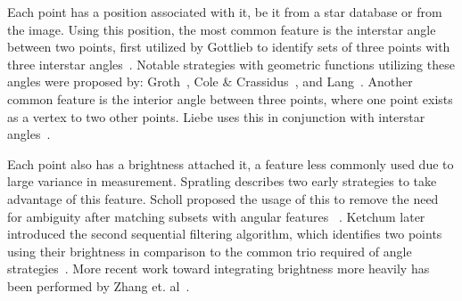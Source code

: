 Each point has a position associated with it, be it from a star database or from the image.
Using this position, the most common feature is the interstar angle between two points, first utilized by
Gottlieb to identify sets of three points with three interstar angles~\cite{gottlieb:spacecraftAttitudeDetermination}.
Notable strategies with geometric functions utilizing these angles were proposed by:
Groth~\cite{groth:patternMatchingMethod}, Cole \&
Crassidus~\cite{coleAndCrassidis:sphericalTriangleMethod,coleAndCrassidis:planarTriangleMethod}, and
Lang~\cite{lang:astrometryDotNet}.
Another common feature is the interior angle between three points, where one point exists as a vertex to two other
points.
Liebe uses this in conjunction with interstar angles~\cite{liebe:starTrackersAttitudeDetermination}.



Each point also has a brightness attached it, a feature less commonly used due to large variance in measurement.
Spratling describes two early strategies to take advantage of this feature.
Scholl proposed the usage of this to remove the need for ambiguity after matching subsets with angular features
~\cite{scholl:starFieldIdentification}.
Ketchum later introduced the second sequential filtering algorithm, which identifies two points using their brightness
in comparison to the common trio required of angle strategies~\cite{ketchum:onboardStarIdentification}.
More recent work toward integrating brightness more heavily has been performed by Zhang et.
al~\cite{zhang:brightnessReferenced}.

